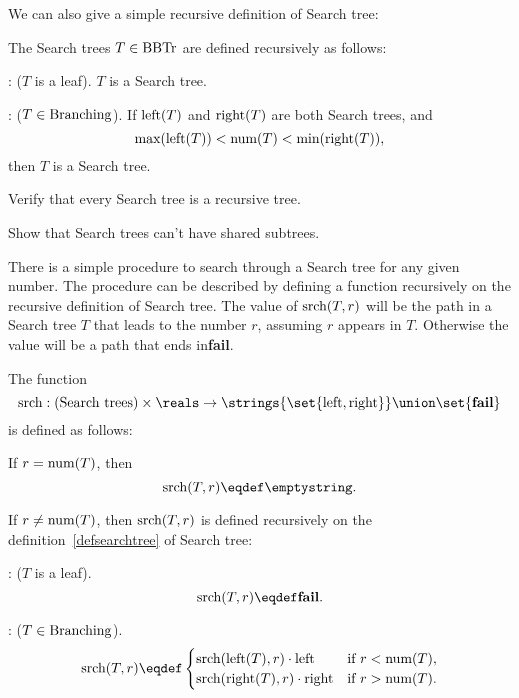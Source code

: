 We can also give a simple recursive definition of Search tree:
\begin{definition}
The Search trees $T \in \text{BBTr}$ are defined recursively as follows:

: ($T$ is a leaf).  $T$ is a Search tree.

: ($T \in \text{Branching}$).
If $\text{left}(T)$ and $\text{right}(T)$ are both Search trees, and
\[
\text{max}(\text{left}(T)) < \text{num}(T) < \text{min}(\text{right}(T)),
\]
then $T$ is a Search tree.
\end{definition}

\begin{problem}
Verify that every Search tree is a recursive tree.

\hint Show that Search trees can't have shared subtrees.

\begin{solution}
\TBA{}
\end{solution}
\end{problem}

There is a simple procedure to search through a Search tree for any
given number.  The procedure can be described by defining a function
\trsrch{} recursively on the recursive definition of Search tree.  The
value of $\text{srch}(T,r)$ will be the path in a Search tree $T$ that
leads to the number $r$, assuming $r$ appears in $T$.  Otherwise the
value will be a path that ends in\textbf{fail}.

\begin{definition}
The function
\[
\trsrch{}: \text{(Search trees)} \times \reals \to
\strings{\set{\leftsub{},\rightsub{}}} \union \set{\textbf{fail}}
\]
is defined as follows:

If $r = \text{num}(T)$, then
\[
\trsrch{(T,r)} \eqdef \emptystring.
\]

If $r \neq \text{num}(T)$, then $\text{srch}(T,r)$ is defined recursively
on the definition~\ref{defsearchtree} of Search tree:

: ($T$ is a leaf).
\[
\trsrch{(T,r)} \eqdef \textbf{fail}.
\]

: ($T \in \text{Branching}$).
\[
\trsrch{(T,r)} \eqdef
 \begin{cases} 
\trsrch{(\leftsub{(T)},r)} \cdot \leftsub{} & \text{if $r < \nlbl{(T)$}},\\
\trsrch{(\rightsub{(T)},r)}\cdot \rightsub{}& \text{if $r > \nlbl{(T)}$}.
\end{cases}
\]
\end{definition}

